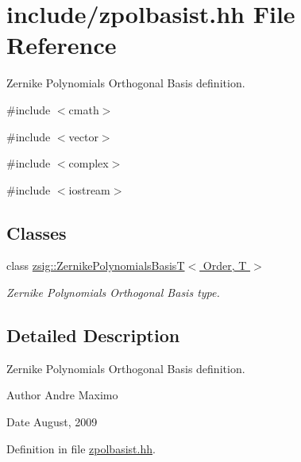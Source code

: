 \hypertarget{zpolbasist_8hh}{
\section{include/zpolbasist.hh File Reference}
\label{zpolbasist_8hh}
}


Zernike Polynomials Orthogonal Basis definition.  


{\ttfamily \#include $<$cmath$>$}\par
{\ttfamily \#include $<$vector$>$}\par
{\ttfamily \#include $<$complex$>$}\par
{\ttfamily \#include $<$iostream$>$}\par
\subsection*{Classes}
\begin{DoxyCompactItemize}
\item 
class \hyperlink{classzsig_1_1ZernikePolynomialsBasisT}{zsig::ZernikePolynomialsBasisT$<$ Order, T $>$}
\begin{DoxyCompactList}\small\item\em Zernike Polynomials Orthogonal Basis type. \item\end{DoxyCompactList}\end{DoxyCompactItemize}


\subsection{Detailed Description}
Zernike Polynomials Orthogonal Basis definition. \begin{DoxyAuthor}{Author}
Andre Maximo 
\end{DoxyAuthor}
\begin{DoxyDate}{Date}
August, 2009 
\end{DoxyDate}


Definition in file \hyperlink{zpolbasist_8hh_source}{zpolbasist.hh}.

